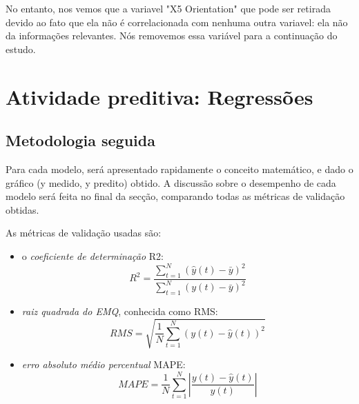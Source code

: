 \documentclass[paper=a4, fontsize=11pt]{article} %
\numberwithin{equation}{section} %
\numberwithin{figure}{section} %
\numberwithin{table}{section} %
\begin{document}
No entanto, nos vemos que a variavel "X5 Orientation" que pode ser retirada devido ao fato que ela não é correlacionada com nenhuma outra variavel:
ela não da informações relevantes.
Nós removemos essa variável para a continuação do estudo.


\newcommand{\norme}[1]{\left\Vert #1\right\Vert}
\newcommand{\abs}[1]{\left\vert #1\right\vert}
\newpage
\section{Atividade preditiva: Regressões}

\subsection{Metodologia seguida}

Para cada modelo, será apresentado rapidamente o conceito matemático, e dado o gráfico (y medido, y predito) obtido.\newline
A discussão sobre o desempenho de cada modelo será feita no final da secção, comparando todas as métricas de validação obtidas.\newline

As métricas de validação usadas são:
\begin{itemize}
\item o \emph{coeficiente de determinação} R2:
    \begin{equation}
    R^{2} = \frac{\sum_{t=1}^{N} (\hat{y}(t) - \bar{y})^2}{\sum_{t=1}^{N} (y(t) - \bar{y})^2}
    \end{equation}
\item \emph{raiz quadrada do EMQ}, conhecida como RMS:
    \begin{equation}
    RMS = \sqrt{\frac{1}{N}\sum_{t=1}^{N} (y(t) - \hat{y}(t))^2}
    \end{equation}
\item \emph{erro absoluto médio percentual} MAPE:
    \begin{equation}
    MAPE = \frac{1}{N}\sum_{t=1}^{N} \abs{\frac{y(t) - \hat{y}(t)}{y(t)}}
    \end{equation}
\end{itemize}
\end{document}

